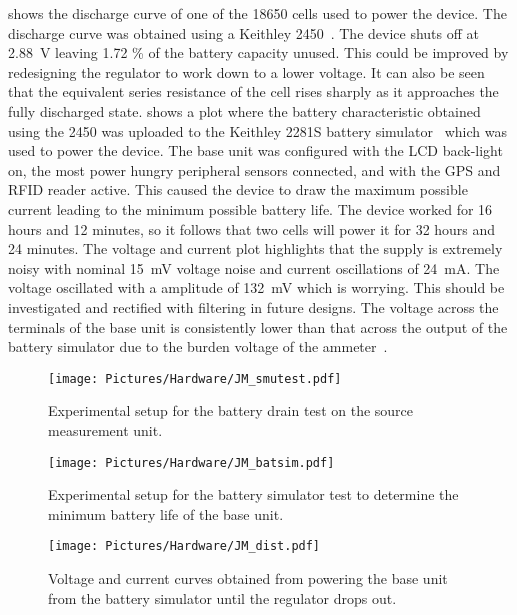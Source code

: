  shows the discharge curve of one of the 18650 cells used to power the device. The discharge curve was obtained using a Keithley 2450~\cite{JM_2450SMU}. The device shuts off at \SI{2.88}{V} leaving 1.72 \% of the battery capacity unused. This could be improved by redesigning the regulator to work down to a lower voltage. It can also be seen that the equivalent series resistance of the cell rises sharply as it approaches the fully discharged state.  shows a plot where the battery characteristic obtained using the 2450 was uploaded to the Keithley 2281S battery simulator~\cite{JM_2281} which was used to power the device. The base unit was configured with the LCD back-light on, the most power hungry peripheral sensors connected, and with the GPS and RFID reader active. This caused the device to draw the maximum possible current leading to the minimum possible battery life. The device worked for 16 hours and 12 minutes, so it follows that two cells will power it for 32 hours and 24 minutes. The voltage and current plot highlights that the supply is extremely noisy with nominal \SI{15}{mV} voltage noise and current oscillations of \SI{24}{mA}. The voltage oscillated with a amplitude of \SI{132}{mV} which is worrying. This should be investigated and rectified with filtering in future designs. The voltage across the terminals of the base unit is consistently lower than that across the output of the battery simulator due to the burden voltage of the ammeter~\cite{JM_burden}.


    
    
\begin{figure}
	    \centering
	    \texttt{[image: Pictures/Hardware/JM\_smutest.pdf]}
	    \captionsetup{justification = centering}
		\caption{Experimental setup for the battery drain test on the source measurement unit.}
		\label{Figure:JM_smutest}
	\end{figure} 
	
\begin{figure}
	    \centering
	    \texttt{[image: Pictures/Hardware/JM\_batsim.pdf]}
	    \captionsetup{justification = centering}
		\caption{Experimental setup for the battery simulator test to determine the minimum battery life of the base unit.}
		\label{Figure:JM_batsim}
	\end{figure} 
	
	\begin{figure}
	    \centering
	    \texttt{[image: Pictures/Hardware/JM\_dist.pdf]}
	    \captionsetup{justification = centering}
		\caption{Voltage and current curves obtained from powering the base unit from the battery simulator until the regulator drops out.}
		\label{Figure:JM_dist}
	\end{figure}

